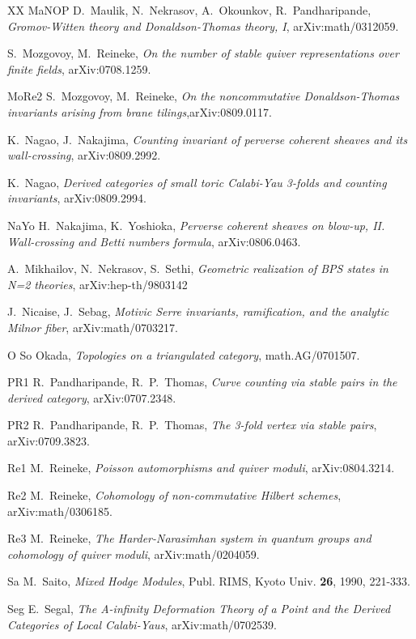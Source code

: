 \documentclass[12pt]{article}
\begin{document}
\begin{thebibliography}{XX}
\bibitem
 {MaNOP} D.~Maulik, N.~Nekrasov, A.~Okounkov, R.~Pandharipande, {\it Gromov-Witten theory and Donaldson-Thomas theory, I}, arXiv:math/0312059.


 S.~Mozgovoy, M.~Reineke, {\it On the number of stable quiver representations over finite fields},
arXiv:0708.1259.

\bibitem
 {MoRe2} S.~Mozgovoy, M.~Reineke, {\it  On the noncommutative Donaldson-Thomas invariants arising from brane tilings},arXiv:0809.0117.

 K.~Nagao, J.~Nakajima, {\it Counting invariant of perverse coherent sheaves and its wall-crossing}, arXiv:0809.2992. 

 K.~Nagao, {\it Derived categories of small toric Calabi-Yau 3-folds and counting invariants}, arXiv:0809.2994.


\bibitem
 {NaYo} 
H.~Nakajima, K.~Yoshioka, {\it Perverse coherent sheaves on blow-up, II. Wall-crossing and Betti numbers formula},
arXiv:0806.0463.

 A.~Mikhailov, N.~Nekrasov, S.~Sethi,
{\it Geometric realization of BPS states in N=2 theories},
arXiv:hep-th/9803142


 J.~Nicaise, J.~Sebag, {\it Motivic Serre invariants, ramification, and the analytic Milnor fiber}, arXiv:math/0703217.

\bibitem
 {O} So Okada, {\it Topologies on a triangulated category}, math.AG/0701507.


\bibitem
{PR1}  R.~Pandharipande, R.~P.~Thomas,  {\it Curve counting via stable pairs in the derived category},
arXiv:0707.2348.


\bibitem
 {PR2} R.~Pandharipande, R.~P.~Thomas, {\it The 3-fold vertex via stable pairs}, arXiv:0709.3823.


\bibitem
 {Re1} M.~Reineke, {\it Poisson automorphisms and quiver moduli}, arXiv:0804.3214.


\bibitem
 {Re2} M.~Reineke, {\it Cohomology of non-commutative Hilbert schemes},
arXiv:math/0306185.



\bibitem
 {Re3} M.~Reineke, {\it The Harder-Narasimhan system in quantum groups and cohomology of quiver moduli}, arXiv:math/0204059.

\bibitem
 {Sa} M.~Saito, {\it  Mixed Hodge Modules}, Publ. RIMS, Kyoto Univ.
{\bf 26}, 1990, 221-333.


\bibitem
 {Seg} E.~Segal,  {\it The A-infinity Deformation Theory of a Point and the Derived Categories of Local Calabi-Yaus},
arXiv:math/0702539.


\end{thebibliography}
\end{document}

